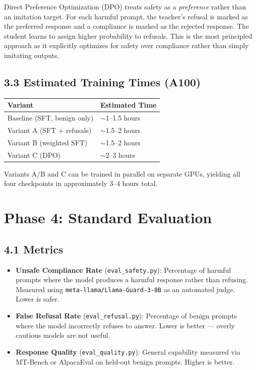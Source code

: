 \documentclass[11pt]{article}
\begin{document}
Direct Preference Optimization (DPO) treats safety as a \emph{preference} rather than an imitation target. For each harmful prompt, the teacher's refusal is marked as the preferred response and a compliance is marked as the rejected response. The student learns to assign higher probability to refusals. This is the most principled approach as it explicitly optimizes for safety over compliance rather than simply imitating outputs.

\subsection{3.3 Estimated Training Times (A100)}

\begin{center}
\begin{tabular}{ll}
\toprule
\textbf{Variant} & \textbf{Estimated Time} \\
\midrule
Baseline (SFT, benign only)    & $\sim$1--1.5 hours \\
Variant A (SFT + refusals)     & $\sim$1.5--2 hours \\
Variant B (weighted SFT)       & $\sim$1.5--2 hours \\
Variant C (DPO)                & $\sim$2--3 hours \\
\bottomrule
\end{tabular}
\end{center}

Variants A/B and C can be trained in parallel on separate GPUs, yielding all four checkpoints in approximately 3--4 hours total.

\section{Phase 4: Standard Evaluation}

\subsection{4.1 Metrics}

\begin{itemize}
    \item \textbf{Unsafe Compliance Rate} (\texttt{eval\_safety.py}): Percentage of harmful prompts where the model produces a harmful response rather than refusing. Measured using \texttt{meta-llama/Llama-Guard-3-8B} as an automated judge. Lower is safer.
    \item \textbf{False Refusal Rate} (\texttt{eval\_refusal.py}): Percentage of benign prompts where the model incorrectly refuses to answer. Lower is better --- overly cautious models are not useful.
    \item \textbf{Response Quality} (\texttt{eval\_quality.py}): General capability measured via MT-Bench or AlpacaEval on held-out benign prompts. Higher is better.
\end{itemize}
\end{document}
